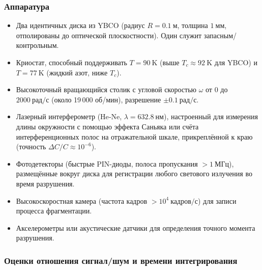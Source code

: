 \documentclass[12pt,a4paper]{article}
\begin{document}
	\subsubsection{Аппаратура}
	
	\begin{itemize}
		\item Два идентичных диска из YBCO (радиус \(R = 0.1\ \text{м}\), толщина \(1\ \text{мм}\), отполированы до оптической плоскостности). Один служит запасным/контрольным.
		\item Криостат, способный поддерживать \(T = 90\ \text{K}\) (выше \(T_c \approx 92\ \text{K}\) для YBCO) и \(T = 77\ \text{K}\) (жидкий азот, ниже \(T_c\)).
		\item Высокоточный вращающийся столик с угловой скоростью \(\omega\) от 0 до \(2000\ \text{рад/с}\) (около 19 000 об/мин), разрешение \(\pm 0.1\ \text{рад/с}\).
		\item Лазерный интерферометр (He‑Ne, \(\lambda = 632.8\ \text{нм}\)), настроенный для измерения длины окружности с помощью эффекта Саньяка или счёта интерференционных полос на отражательной шкале, прикреплённой к краю (точность \(\Delta C/C \approx 10^{-6}\)).
		\item Фотодетекторы (быстрые PIN-диоды, полоса пропускания \(> 1\ \text{МГц}\)), размещённые вокруг диска для регистрации любого светового излучения во время разрушения.
		\item Высокоскоростная камера (частота кадров \(> 10^4\ \text{кадров/с}\)) для записи процесса фрагментации.
		\item Акселерометры или акустические датчики для определения точного момента разрушения.
	\end{itemize}
	
	\subsubsection{Оценки отношения сигнал/шум и времени интегрирования}
	
\end{document}
